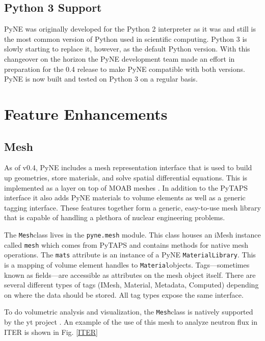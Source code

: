 \documentclass{anstrans}
\newcommand{\Mesh}{\texttt{Mesh}}
\newcommand{\Material}{\texttt{Material}}
\begin{document}
\subsection{Python 3 Support}

PyNE was originally developed for the Python 2 interpreter as it was 
and still is the most common version of Python used in scientific computing. 
Python 3 is slowly starting to replace it, however, as the default Python 
version. With this changeover on the horizon the PyNE development team 
made an effort in preparation for the 0.4 release to make PyNE compatible 
with both versions. PyNE is now built and tested on Python 3 on a regular basis.

\section{Feature Enhancements}

\subsection{Mesh}

As of v0.4, PyNE includes a mesh representation interface that is used to 
build up geometries, store materials, and solve spatial differential equations.
This is implemented as a layer on top of MOAB meshes \cite{tautges_moab:_2004}.
In addition to the PyTAPS interface \cite{pytaps} it also adds PyNE materials to 
volume elements as well as a generic tagging interface. These features together 
form a generic, easy-to-use mesh library that is capable of handling a plethora
of nuclear engineering problems.

The \Mesh class lives in the \texttt{pyne.mesh} module. This class houses an 
iMesh instance called \texttt{mesh} which comes from PyTAPS and contains 
methods for native mesh operations. The \texttt{mats} attribute is an 
instance of a PyNE \texttt{MaterialLibrary}. This is a mapping of volume 
element handles to \Material objects. Tags---sometimes known as fields---are 
accessible as attributes on the mesh object itself. There are several different types
of tags (IMesh, Material, Metadata, Computed) depending on where the data should
be stored. All tag types expose the same interface. 

To do volumetric analysis and visualization, the \Mesh class is natively supported 
by the yt project \cite{2011ApJS..192....9T}. An example of the use of this mesh
to analyze neutron flux in ITER is shown in Fig. \ref{ITER}
\end{document}
